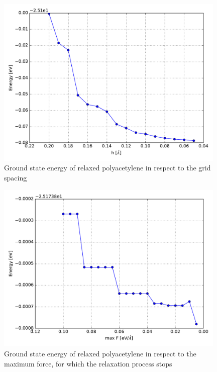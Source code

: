 \begin{figure}[!p]
	\centering
	\includegraphics[width = 11cm]{Images/polyacetylene/convergence/gridspacing-energy}
	\caption{Ground state energy of relaxed polyacetylene in respect to the grid spacing}
	\label{image_poly_grid_energy}
\end{figure}
\begin{figure}[!p]
	\centering
	\includegraphics[width = 11cm]{Images/polyacetylene/convergence/forces-energy}
	\caption{Ground state energy of relaxed polyacetylene in respect to the maximum force, for which the relaxation process stops}
	\label{image_poly_force_energy}
\end{figure}
